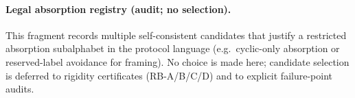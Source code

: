 \paragraph{Legal absorption registry (audit; no selection).} \AuditTag This fragment records multiple self-consistent candidates that justify a restricted absorption subalphabet in the protocol language (e.g.\ cyclic-only absorption or reserved-label avoidance for framing). No choice is made here; candidate selection is deferred to rigidity certificates (RB-A/B/C/D) and to explicit failure-point audits.